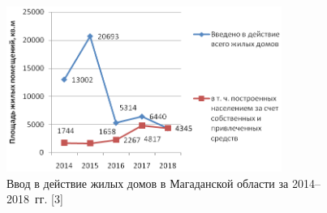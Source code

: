 \begin{figure}[H]

  \begin{center}
    \includegraphics[width=0.8\textwidth]{authors/serebryakova-fig-3.png}
  \end{center}
\vspace{-8pt}
  \caption{Ввод в действие жилых домов в Магаданской области
за 2014--2018~гг. [3]}
  \label{fig:serebryakova-fig-3}
\vspace{-8pt}
\end{figure}
